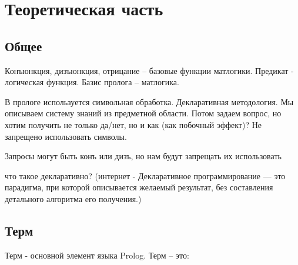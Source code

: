 \documentclass[12pt]{report}
\begin{document}
\chapter*{Теоретическая часть}





\section{Общее}
Конъюнкция, дизъюнкция, отрицание  --  базовые функции матлогики. Предикат - логическая функция. Базис пролога -- матлогика.

В прологе используется символьная обработка. Декларативная методология. Мы описываем систему знаний из предметной области. Потом задаем вопрос, но хотим получить не только да/нет, но и как (как побочный эффект)? Не запрещено использовать символы. 


Запросы могут быть конъ или дизъ, но нам будут запрещать их использовать

что такое декларативно? (интернет - Декларативное программирование — это парадигма, при которой описывается желаемый результат, без составления детального алгоритма его получения.)









\section{Терм}

Терм - основной элемент языка Prolog. Терм – это:
\end{document}
